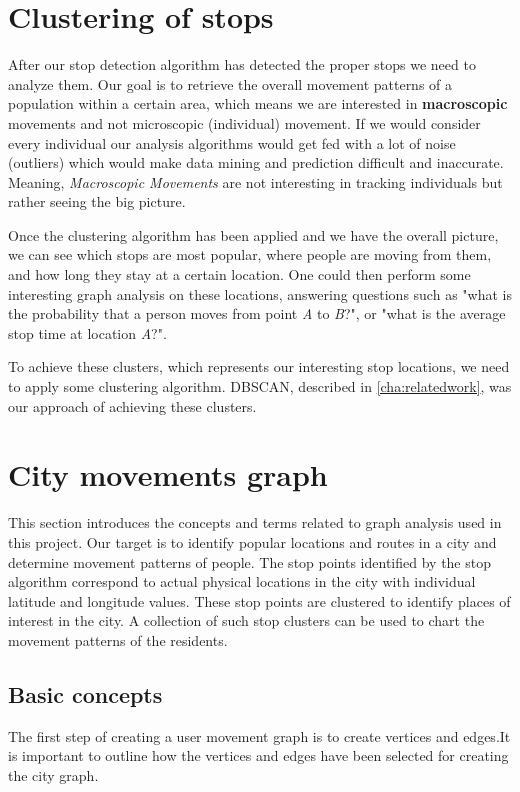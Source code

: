\section{Clustering of stops}

After our stop detection algorithm has detected the proper stops we need to analyze them. Our goal is to retrieve the overall movement patterns of a population within a certain area, which means we are interested in \textbf{macroscopic} movements and not microscopic (individual) movement. If we would consider every individual our analysis algorithms would get fed with a lot of noise (outliers) which would make data mining and prediction difficult and inaccurate. Meaning, \textit{Macroscopic Movements} are not interesting in tracking individuals but rather seeing the big picture.

 Once the clustering algorithm has been applied and we have the overall picture, we can see which stops are most popular, where people are moving from them, and how long they stay at a certain location. One could then perform some interesting graph analysis on these locations, answering questions such as "what is the probability that a person moves from point \textit{A} to \textit{B}?", or "what is the average stop time at location \textit{A}?". 
 
 To achieve these clusters, which represents our interesting stop locations, we need to apply some clustering algorithm. DBSCAN, described in \autoref{cha:relatedwork}, was our approach of achieving these clusters.  

\FloatBarrier
\section{City movements graph}
\label{cha:movementsGraph}
This section introduces the concepts and terms related to graph analysis used in this project. Our target is to identify popular locations and routes in a city and determine movement patterns of people. The stop points identified by the stop algorithm correspond to actual physical locations in the city with individual latitude and longitude values. These stop points are clustered to identify places of interest in the city. A collection of such stop clusters can be used to chart the movement patterns of the residents.

\subsection{Basic concepts}\label{cha:basicConceptsGraph}The first step of creating a user movement graph is to create vertices and edges.It is important to outline how the vertices and edges have been selected for creating the city graph. 



